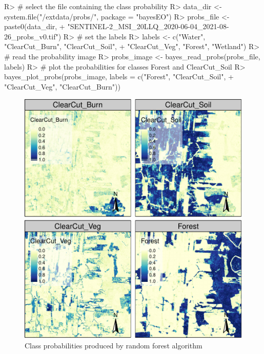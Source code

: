 \documentclass[
  shortnames]{jss}
\begin{document}
\begin{CodeChunk}
\begin{CodeInput}
R> # select the file containing the class probability
R> data_dir <- system.file("/extdata/probs/", package = "bayesEO")
R> probs_file <- paste0(data_dir, 
+                      "SENTINEL-2_MSI_20LLQ_2020-06-04_2021-08-26_probs_v0.tif")
R> # set the labels
R> labels <- c("Water", "ClearCut_Burn", "ClearCut_Soil",
+             "ClearCut_Veg", "Forest", "Wetland")
R> # read the probability image 
R> probs_image <- bayes_read_probs(probs_file, labels)
R> # plot the probabilities for classes Forest and ClearCut_Soil
R> bayes_plot_probs(probs_image, labels = c("Forest", "ClearCut_Soil", 
+                                          "ClearCut_Veg", "ClearCut_Burn"))
\end{CodeInput}
\begin{figure}[h]

{\centering \includegraphics{Bayesian_smoothing_JSS_files/figure-latex/pcube-1} 

}

\caption[Class probabilities produced by random forest algorithm]{Class probabilities produced by random forest algorithm}\label{fig:pcube}
\end{figure}
\end{CodeChunk}
\end{document}
